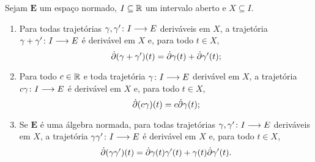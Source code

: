 \begin{proposition}
\label{prop:derivada.propriedades}
Sejam $\bm E$ um espaço normado, $I \subseteq \mathbb{R}$ um intervalo aberto e $X \subseteq I$.
	\begin{enumerate}
	\item Para todas trajetórias $\gamma,\gamma'\colon \allowbreak I \longrightarrow E$ deriváveis em $X$, a trajetória $\gamma+\gamma'\colon \allowbreak I \longrightarrow E$ é derivável em $X$ e, para todo $t \in X$,
		\begin{equation*}
		\dot{\partial} (\gamma+\gamma')(t) = \dot{\partial} \gamma(t) + \dot{\partial} \gamma'(t);
		\end{equation*}
	\item Para todo $c \in \mathbb{R}$ e toda trajetória $\gamma\colon \allowbreak I \longrightarrow E$ derivável em $X$, a trajetória $c \gamma\colon \allowbreak I \longrightarrow E$ é derivável em $X$ e, para todo $t \in X$,
		\begin{equation*}
		\dot{\partial} (c \gamma)(t) = c\dot{\partial} \gamma(t);
		\end{equation*}
	\item Se $\bm E$ é uma álgebra normada, para todas trajetórias $\gamma,\gamma'\colon \allowbreak I \longrightarrow E$ deriváveis em $X$, a trajetória $\gamma \gamma'\colon \allowbreak I \longrightarrow E$ é derivável em $X$ e, para todo $t \in X$,
		\begin{equation*}
		\dot{\partial} (\gamma \gamma')(t) = \dot{\partial} \gamma(t)\gamma'(t) + \gamma(t)\dot{\partial} \gamma'(t).
		\end{equation*}
	\end{enumerate}
\end{proposition}
